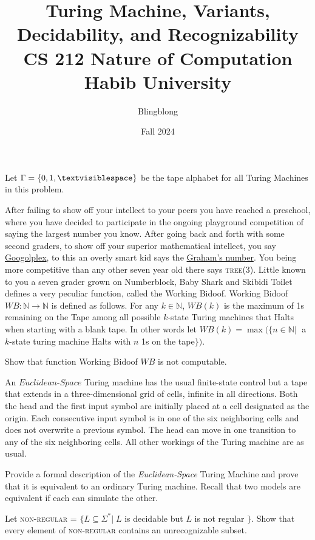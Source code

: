 \documentclass[addpoints]{exam}
\title{Turing Machine, Variants, Decidability, and Recognizability\\ \vspace{0.5cm} \Large CS 212 Nature of Computation\\Habib University}
\author{Blingblong} %
\date{Fall 2024}
\newcommand{\blank}{\textvisiblespace}
\begin{document}
\maketitle

\begin{questions}

    \question[10] Let $\Gamma = \{0, 1, \blank\}$ be the tape alphabet for all Turing Machines in this problem. 
    
    After failing to show off your intellect to your peers you have reached a preschool, where you have decided to participate in the ongoing playground competition of saying the largest number you know. After going back and forth with some second graders, to show off your superior mathematical intellect, you say \href{https://en.wikipedia.org/wiki/Googolplex}{Googolplex}, to this an overly smart kid says the \href{https://en.wikipedia.org/wiki/Graham%27s_number}{Graham's number}. You being more competitive than any other seven year old there says \textsc{tree}(3). Little known to you a seven grader grown on Numberblock, Baby Shark and Skibidi Toilet defines a very peculiar function, called the Working Bidoof. 
    Working Bidoof $WB : \mathbb{N} \to \mathbb{N}$ is defined as follows. For any $k \in \mathbb{N}$, $WB(k)$ is the maximum of 1s remaining on the Tape among all possible $k$-state Turing machines that Halts when starting with a blank tape. In other words let $WB(k) = \max(\{n \in \mathbb{N}|\;$ a $k$-state turing machine Halts with $n$ 1s on the tape$\})$. 

    Show that function Working Bidoof $WB$ is not computable.
    
    \begin{solution}
    \end{solution}
    
    \question[10] An $\textit{Euclidean-Space}$ Turing machine has the usual finite-state control but a tape that extends in a three-dimensional grid of cells, infinite in all directions. Both the head and the first input symbol are initially placed at a cell designated as the origin. Each consecutive input symbol is in one of the six neighboring cells and does not overwrite a previous symbol. The head can move in one transition to any of the six neighboring cells. All other workings of the Turing machine are as usual.
    
    Provide a formal description of the \textit{Euclidean-Space} Turing Machine and prove that it is equivalent to an ordinary Turing machine. Recall that two models are equivalent if each can simulate the other.
    
    \begin{solution}
    \end{solution}
      
    \question[10] Let \textsc{non-regular} = $\{L \subseteq \Sigma^*|\; L$ is decidable but $L$ is not regular $\}$. 
    Show that every element of \textsc{non-regular} contains an unrecognizable subset.
    \begin{solution}
    \end{solution}
    \end{questions}
\end{document}
